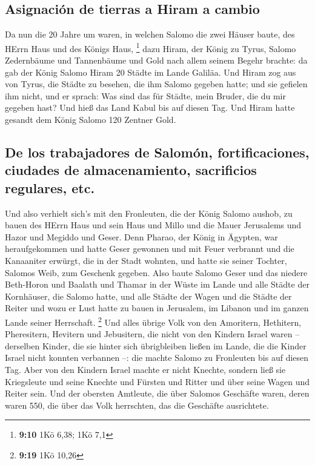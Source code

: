 \hypertarget{asignaciuxf3n-de-tierras-a-hiram-a-cambio}{%
\subsection{Asignación de tierras a Hiram a
cambio}\label{asignaciuxf3n-de-tierras-a-hiram-a-cambio}}

 Da nun die 20 Jahre um waren, in welchen Salomo die zwei
Häuser baute, des HErrn Haus und des Königs Haus, \footnote{\textbf{9:10}
  1Kö 6,38; 1Kö 7,1}  dazu Hiram, der König zu Tyrus,
Salomo Zedernbäume und Tannenbäume und Gold nach allem seinem Begehr
brachte: da gab der König Salomo Hiram 20 Städte im Lande Galiläa.
 Und Hiram zog aus von Tyrus, die Städte zu besehen, die
ihm Salomo gegeben hatte; und sie gefielen ihm nicht, 
und er sprach: Was sind das für Städte, mein Bruder, die du mir gegeben
hast? Und hieß das Land Kabul bis auf diesen Tag.  Und
Hiram hatte gesandt dem König Salomo 120 Zentner Gold.

\hypertarget{de-los-trabajadores-de-salomuxf3n-fortificaciones-ciudades-de-almacenamiento-sacrificios-regulares-etc.}{%
\subsection{De los trabajadores de Salomón, fortificaciones, ciudades de
almacenamiento, sacrificios regulares,
etc.}\label{de-los-trabajadores-de-salomuxf3n-fortificaciones-ciudades-de-almacenamiento-sacrificios-regulares-etc.}}

 Und also verhielt sich's mit den Fronleuten, die der
König Salomo aushob, zu bauen des HErrn Haus und sein Haus und Millo und
die Mauer Jerusalems und Hazor und Megiddo und Geser. 
Denn Pharao, der König in Ägypten, war heraufgekommen und hatte Geser
gewonnen und mit Feuer verbrannt und die Kanaaniter erwürgt, die in der
Stadt wohnten, und hatte sie seiner Tochter, Salomos Weib, zum Geschenk
gegeben.  Also baute Salomo Geser und das niedere
Beth-Horon  und Baalath und Thamar in der Wüste im Lande
 und alle Städte der Kornhäuser, die Salomo hatte, und
alle Städte der Wagen und die Städte der Reiter und wozu er Lust hatte
zu bauen in Jerusalem, im Libanon und im ganzen Lande seiner Herrschaft.
\footnote{\textbf{9:19} 1Kö 10,26}  Und alles übrige Volk
von den Amoritern, Hethitern, Pheresitern, Hevitern und Jebusitern, die
nicht von den Kindern Israel waren --  derselben Kinder,
die sie hinter sich übrigbleiben ließen im Lande, die die Kinder Israel
nicht konnten verbannen --: die machte Salomo zu Fronleuten bis auf
diesen Tag.  Aber von den Kindern Israel machte er nicht
Knechte, sondern ließ sie Kriegsleute und seine Knechte und Fürsten und
Ritter und über seine Wagen und Reiter sein.  Und der
obersten Amtleute, die über Salomos Geschäfte waren, deren waren 550,
die über das Volk herrschten, das die Geschäfte ausrichtete.

